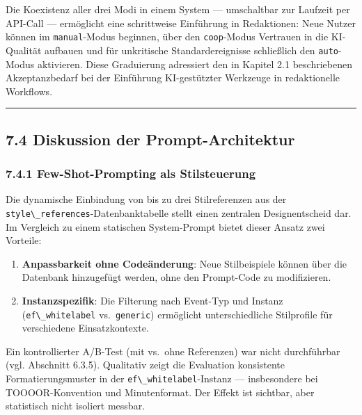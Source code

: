 Die Koexistenz aller drei Modi in einem System --- umschaltbar zur
Laufzeit per API-Call --- ermöglicht eine schrittweise Einführung in
Redaktionen: Neue Nutzer können im
\passthrough{\lstinline!manual!}-Modus beginnen, über den
\passthrough{\lstinline!coop!}-Modus Vertrauen in die KI-Qualität
aufbauen und für unkritische Standardereignisse schließlich den
\passthrough{\lstinline!auto!}-Modus aktivieren. Diese Graduierung
adressiert den in Kapitel 2.1 beschriebenen Akzeptanzbedarf bei der
Einführung KI-gestützter Werkzeuge in redaktionelle Workflows.

\begin{center}\rule{0.5\linewidth}{0.5pt}\end{center}

\subsection{7.4 Diskussion der
Prompt-Architektur}\label{diskussion-der-prompt-architektur}

\subsubsection{7.4.1 Few-Shot-Prompting als
Stilsteuerung}\label{few-shot-prompting-als-stilsteuerung}

Die dynamische Einbindung von bis zu drei Stilreferenzen aus der
\passthrough{\lstinline!style\_references!}-Datenbanktabelle stellt
einen zentralen Designentscheid dar. Im Vergleich zu einem statischen
System-Prompt bietet dieser Ansatz zwei Vorteile:

\begin{enumerate}
\def\labelenumi{\arabic{enumi}.}
\tightlist
\item
  \textbf{Anpassbarkeit ohne Codeänderung}: Neue Stilbeispiele können
  über die Datenbank hinzugefügt werden, ohne den Prompt-Code zu
  modifizieren.
\item
  \textbf{Instanzspezifik}: Die Filterung nach Event-Typ und Instanz
  (\passthrough{\lstinline!ef\_whitelabel!}
  vs.~\passthrough{\lstinline!generic!}) ermöglicht unterschiedliche
  Stilprofile für verschiedene Einsatzkontexte.
\end{enumerate}

Ein kontrollierter A/B-Test (mit vs.~ohne Referenzen) war nicht
durchführbar (vgl. Abschnitt 6.3.5). Qualitativ zeigt die Evaluation
konsistente Formatierungsmuster in der
\passthrough{\lstinline!ef\_whitelabel!}-Instanz --- insbesondere bei
TOOOOR-Konvention und Minutenformat. Der Effekt ist sichtbar, aber
statistisch nicht isoliert messbar.

